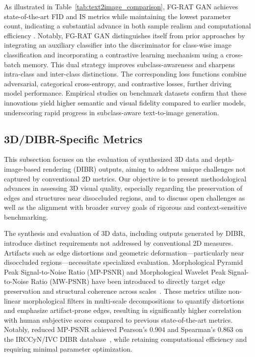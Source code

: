 \documentclass[sigconf]{acmart}
\begin{document}
As illustrated in Table~\ref{tab:text2image_comparison}, FG-RAT GAN achieves state-of-the-art FID and IS metrics while maintaining the lowest parameter count, indicating a substantial advance in both sample realism and computational efficiency \cite{ref101}. Notably, FG-RAT GAN distinguishes itself from prior approaches by integrating an auxiliary classifier into the discriminator for class-wise image classification and incorporating a contrastive learning mechanism using a cross-batch memory. This dual strategy improves subclass-awareness and sharpens intra-class and inter-class distinctions. The corresponding loss functions combine adversarial, categorical cross-entropy, and contrastive losses, further driving model performance. Empirical studies on benchmark datasets confirm that these innovations yield higher semantic and visual fidelity compared to earlier models, underscoring rapid progress in subclass-aware text-to-image generation.

\subsection{3D/DIBR-Specific Metrics}

This subsection focuses on the evaluation of synthesized 3D data and depth-image-based rendering (DIBR) outputs, aiming to address unique challenges not captured by conventional 2D metrics. Our objective is to present methodological advances in assessing 3D visual quality, especially regarding the preservation of edges and structures near disoccluded regions, and to discuss open challenges as well as the alignment with broader survey goals of rigorous and context-sensitive benchmarking.

The synthesis and evaluation of 3D data, including outputs generated by DIBR, introduce distinct requirements not addressed by conventional 2D measures. Artifacts such as edge distortions and geometric deformation—particularly near disoccluded regions—necessitate specialized evaluation. Morphological Pyramid Peak Signal-to-Noise Ratio (MP-PSNR) and Morphological Wavelet Peak Signal-to-Noise Ratio (MW-PSNR) have been introduced to directly target edge preservation and structural coherence across scales~\cite{ref99}. These metrics utilize non-linear morphological filters in multi-scale decompositions to quantify distortions and emphasize artifact-prone edges, resulting in significantly higher correlation with human subjective scores compared to previous state-of-the-art metrics. Notably, reduced MP-PSNR achieved Pearson's 0.904 and Spearman's 0.863 on the IRCCyN/IVC DIBR database~\cite{ref99}, while retaining computational efficiency and requiring minimal parameter optimization.
\end{document}
